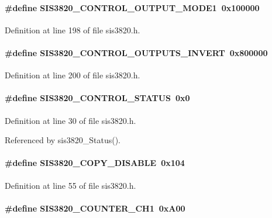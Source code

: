 \paragraph[{SIS3820\_\-CONTROL\_\-OUTPUT\_\-MODE1}]{\setlength{\rightskip}{0pt plus 5cm}\#define SIS3820\_\-CONTROL\_\-OUTPUT\_\-MODE1~0x100000}\hfill\label{sis3820_8h_aeb944a678df182ba975f74930028b017}


Definition at line 198 of file sis3820.h.
\paragraph[{SIS3820\_\-CONTROL\_\-OUTPUTS\_\-INVERT}]{\setlength{\rightskip}{0pt plus 5cm}\#define SIS3820\_\-CONTROL\_\-OUTPUTS\_\-INVERT~0x800000}\hfill\label{sis3820_8h_ac2143569ceeb6916ec0186e0bc3eb2aa}


Definition at line 200 of file sis3820.h.
\paragraph[{SIS3820\_\-CONTROL\_\-STATUS}]{\setlength{\rightskip}{0pt plus 5cm}\#define SIS3820\_\-CONTROL\_\-STATUS~0x0}\hfill\label{sis3820_8h_afd8098728c66ab9170ddaaa999ffa14d}


Definition at line 30 of file sis3820.h.

Referenced by sis3820\_\-Status().
\paragraph[{SIS3820\_\-COPY\_\-DISABLE}]{\setlength{\rightskip}{0pt plus 5cm}\#define SIS3820\_\-COPY\_\-DISABLE~0x104}\hfill\label{sis3820_8h_a2b2ae30da52febaddc51a974a799e9d0}


Definition at line 55 of file sis3820.h.
\paragraph[{SIS3820\_\-COUNTER\_\-CH1}]{\setlength{\rightskip}{0pt plus 5cm}\#define SIS3820\_\-COUNTER\_\-CH1~0xA00}\hfill\label{sis3820_8h_a68503801e54a8813cbc790a208f5b93c}


